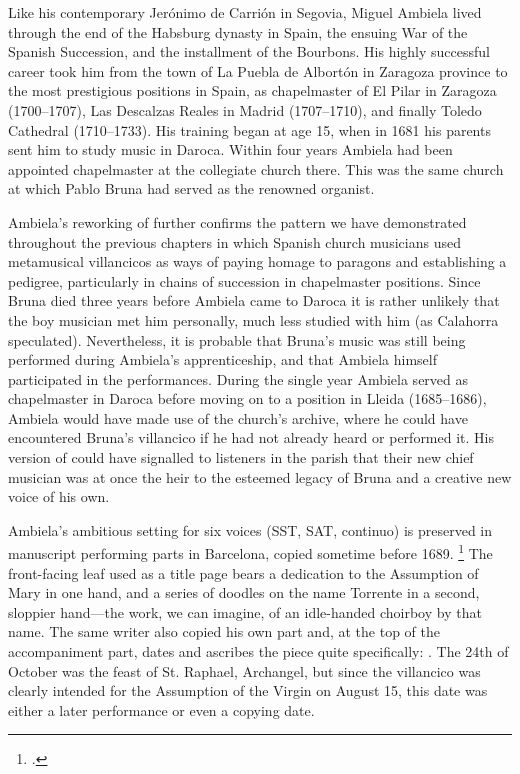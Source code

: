 
Like his contemporary Jerónimo de Carrión in Segovia, Miguel Ambiela lived
through the end of the Habsburg dynasty in Spain, the ensuing War of the Spanish
Succession, and the installment of the Bourbons.
His highly successful career took him from the town of La Puebla de Albortón in
Zaragoza province to the most prestigious positions in Spain, as chapelmaster of
El Pilar in Zaragoza (1700--1707), Las Descalzas Reales in Madrid (1707--1710),
and finally Toledo Cathedral (1710--1733).%
    \Autocites
    [1]{Calahorra:Suban}
    []{Grove}
    {Alvarez:Ambiela}
His training began at age 15, when in 1681 his parents sent him to study music
in Daroca.
Within four years Ambiela had been appointed chapelmaster at the collegiate
church there.
This was the same church at which Pablo Bruna had served as the renowned
organist.

Ambiela's reworking of  further confirms the pattern we
have demonstrated throughout the previous chapters in which Spanish church
musicians used metamusical villancicos as ways of paying homage to paragons and
establishing a pedigree, particularly in chains of succession in chapelmaster
positions.
Since Bruna died three years before Ambiela came to Daroca it is rather unlikely
that the boy musician met him personally, much less studied with him (as
Calahorra speculated).%
    \Autocite{Calahorra:Suban}
Nevertheless, it is probable that Bruna's music was still being performed during
Ambiela's apprenticeship, and that Ambiela himself participated in the
performances.  
During the single year Ambiela served as chapelmaster in Daroca before moving on
to a position in Lleida (1685--1686), Ambiela would have made use of the
church's archive, where he could have encountered Bruna's villancico if he had
not already heard or performed it.
His version of  could have signalled to listeners in the
parish that their new chief musician was at once the heir to the esteemed legacy
of Bruna and a creative new voice of his own.

Ambiela's ambitious setting for six voices (SST, SAT, continuo) is preserved in
manuscript performing parts in Barcelona, copied sometime before 1689.%
    \footnote{.}
The front-facing leaf used as a title page bears a dedication to the Assumption
of Mary in one hand, and a series of doodles on the name Torrente in a second,
sloppier hand---the work, we can imagine, of an idle-handed choirboy by that
name.
The same writer also copied his own  part and, at the top of the
accompaniment part, dates and ascribes the piece quite specifically:
.
The 24th of October was the feast of St. Raphael, Archangel, but since the
villancico was clearly intended for the Assumption of the Virgin on August 15,
this date was either a later performance or even a copying date.

